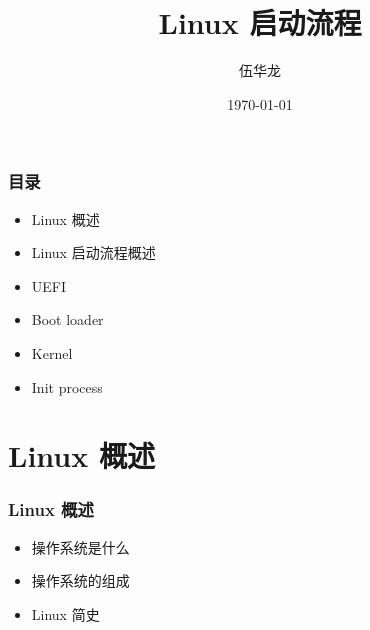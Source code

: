 \documentclass{beamer}
\title[]{Linux 启动流程} %
\author{伍华龙} %
\date{\today} %
\begin{document}
\begin{frame}
    \titlepage %
\end{frame}

\begin{frame}
    \frametitle{目录}
    \begin{itemize}
        \item Linux 概述
        \item Linux 启动流程概述
        \item UEFI
        \item Boot loader
        \item Kernel
        \item Init process
    \end{itemize}
\end{frame}


\section{Linux 概述}

\begin{frame}
    \frametitle{Linux 概述}
    \begin{itemize}
        \item 操作系统是什么
        \item 操作系统的组成
        \item Linux 简史
    \end{itemize}
\end{frame}
\end{document}
